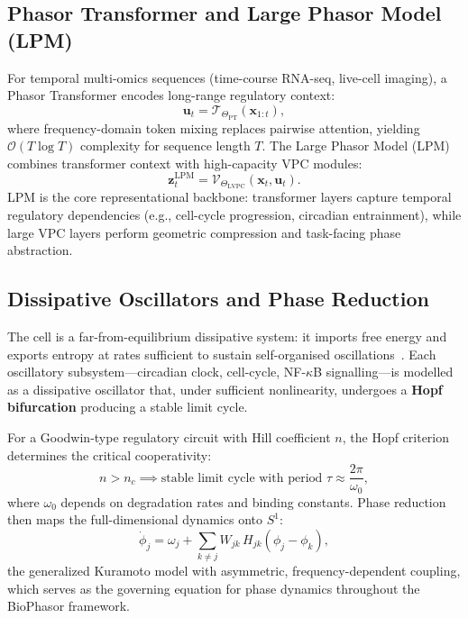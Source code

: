 \documentclass[preprint,12pt,amsmath,amssymb,superscriptaddress,floatfix]{revtex4-2}
\begin{document}
\subsection{Phasor Transformer and Large Phasor Model (LPM)}
\label{subsec:lpm}

For temporal multi-omics sequences (time-course RNA-seq, live-cell
imaging), a Phasor Transformer encodes long-range regulatory context:
\begin{equation}
    \mathbf{u}_t = \mathcal{T}_{\Theta_{\mathrm{PT}}}(\mathbf{x}_{1:t}),
\end{equation}
where frequency-domain token mixing replaces pairwise attention,
yielding $\mathcal{O}(T\log T)$ complexity for sequence length $T$.
The Large Phasor Model (LPM) combines transformer context with
high-capacity VPC modules:
\begin{equation}
    \boldsymbol{z}_t^{\mathrm{LPM}} =
    \mathcal{V}_{\Theta_{\mathrm{LVPC}}}(\mathbf{x}_t, \mathbf{u}_t).
\end{equation}
LPM is the core representational backbone: transformer layers capture
temporal regulatory dependencies (e.g., cell-cycle progression, circadian
entrainment), while large VPC layers perform geometric compression and
task-facing phase abstraction.

\subsection{Dissipative Oscillators and Phase Reduction}
\label{subsec:dissipative}

The cell is a far-from-equilibrium dissipative system: it imports free
energy and exports entropy at rates sufficient to sustain self-organised
oscillations~\cite{ref_prigogine1977}.  Each oscillatory subsystem---circadian
clock, cell-cycle, NF-$\kappa$B signalling---is modelled as a dissipative
oscillator that, under sufficient nonlinearity, undergoes a
\textbf{Hopf bifurcation} producing a stable limit cycle.

For a Goodwin-type regulatory circuit with Hill coefficient $n$, the
Hopf criterion determines the critical cooperativity:
\begin{equation}
    n > n_c \implies \text{stable limit cycle with period }
    \tau \approx \frac{2\pi}{\omega_0},
    \label{eq:hopf}
\end{equation}
where $\omega_0$ depends on degradation rates and binding constants.
Phase reduction then maps the full-dimensional dynamics onto $S^1$:
\begin{equation}
    \dot{\phi}_j = \omega_j
    + \sum_{k \neq j} W_{jk}\,H_{jk}(\phi_j - \phi_k),
    \label{eq:phase_reduction}
\end{equation}
the generalized Kuramoto model with asymmetric, frequency-dependent
coupling, which serves as the governing equation for phase dynamics
throughout the BioPhasor framework.
\end{document}

